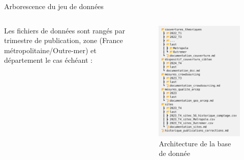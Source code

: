 \begin{frame}{Arborescence du jeu de données}
    \begin{columns}
        \begin{column}{0.4\textwidth}
            Les fichiers de données sont rangés par trimestre de publication, zone (France métropolitaine/Outre-mer) et département le cas échéant :
        \end{column}
            
        \begin{column}{0.6\textwidth}
            \begin{figure}
                \includegraphics[height=0.55\paperheight]{images/architecture.png}
                \caption{\label{fig:archi}Architecture de la base de donnée}
            \end{figure}
        \end{column}
    \end{columns} 
    
\end{frame}


